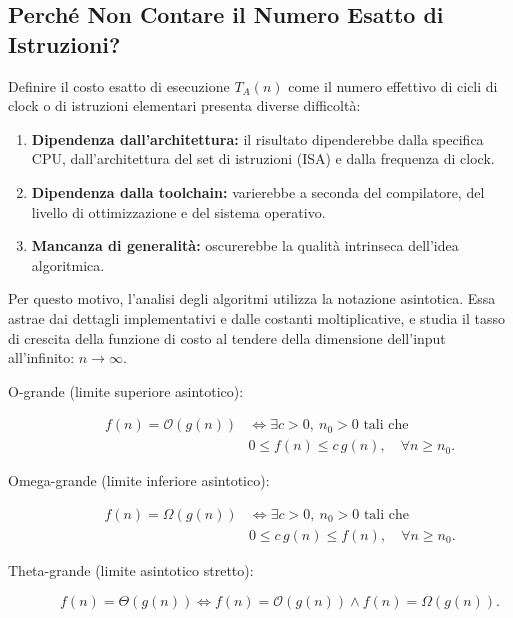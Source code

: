 \subsection{Perché Non Contare il Numero Esatto di Istruzioni?}

Definire il costo esatto di esecuzione $T_A(n)$ come il numero effettivo di cicli di clock o di istruzioni elementari presenta diverse difficoltà:

\begin{enumerate}
  \item \textbf{Dipendenza dall'architettura:} il risultato dipenderebbe dalla specifica CPU, dall'architettura del set di istruzioni (ISA) e dalla frequenza di clock.
  \item \textbf{Dipendenza dalla toolchain:} varierebbe a seconda del compilatore, del livello di ottimizzazione e del sistema operativo.
  \item \textbf{Mancanza di generalità:} oscurerebbe la qualità intrinseca dell'idea algoritmica.
\end{enumerate}

Per questo motivo, l'analisi degli algoritmi utilizza la notazione asintotica. Essa astrae dai dettagli implementativi e dalle costanti moltiplicative, e studia il tasso di crescita della funzione di costo al tendere della dimensione dell'input all'infinito: $n \to \infty$.

\begin{description}
  \item[O-grande (limite superiore asintotico):]
    \[
      \begin{aligned}
        f(n) = \mathcal{O}(g(n)) &\iff
        \exists c > 0,\ n_0 > 0\text{ tali che}\\
        &0 \leq f(n) \leq c\,g(n),\quad \forall n \geq n_0.
      \end{aligned}
    \]
  \item[Omega-grande (limite inferiore asintotico):]
    \[
      \begin{aligned}
        f(n) = \Omega(g(n)) &\iff
        \exists c > 0,\ n_0 > 0\text{ tali che}\\
        &0 \leq c\,g(n) \leq f(n),\quad \forall n \geq n_0.
      \end{aligned}
    \]
  \item[Theta-grande (limite asintotico stretto):]
    \[
      f(n) = \Theta(g(n)) \iff
      f(n) = \mathcal{O}(g(n)) \land f(n) = \Omega(g(n)).
    \]
\end{description}

